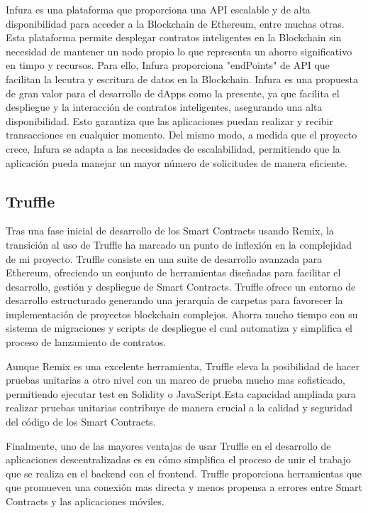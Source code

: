 Infura es una plataforma que proporciona una API escalable y de alta disponibilidad para acceder a la Blockchain de Ethereum, entre muchas otras.
Esta plataforma permite desplegar contratos inteligentes en la Blockchain sin necesidad de mantener un nodo propio lo que representa un ahorro significativo en timpo y recursos.
Para ello, Infura proporciona "endPoints" de API que facilitan la lecutra y escritura de datos en la Blockchain.
Infura es una propuesta de gran valor para el desarrollo de dApps como la presente, ya que facilita el despliegue y la interacción de contratos inteligentes, asegurando una alta disponibilidad. Esto garantiza que las aplicaciones puedan realizar y recibir transacciones en cualquier momento.
Del mismo modo, a medida que el proyecto crece, Infura se adapta a las necesidades de escalabilidad, permitiendo que la aplicación pueda manejar un mayor número de solicitudes de manera eficiente.


\subsection{Truffle}

Tras una fase inicial de desarrollo de los Smart Contracts usando Remix, la transición al uso de Truffle ha marcado un punto de inflexión en la complejidad de mi proyecto.
Truffle consiste en una suite de desarrollo avanzada para Ethereum, ofreciendo un conjunto de herramientas diseñadas para facilitar el desarrollo, gestión y despliegue de Smart Contracts.
Truffle ofrece un entorno de desarrollo estructurado generando una jerarquía de carpetas para favorecer la implementación de proyectos blockchain complejos.
Ahorra mucho tiempo con su sistema de migraciones y scripts de despliegue el cual automatiza y simplifica el proceso de lanzamiento de contratos.

Aunque Remix es una excelente herramienta, Truffle eleva la posibilidad de hacer pruebas unitarias a otro nivel con un marco de prueba mucho mas sofisticado, permitiendo ejecutar test en Solidity o JavaScript.Esta capacidad ampliada para realizar pruebas unitarias contribuye de manera crucial a la calidad y seguridad del código de los Smart Contracts.

Finalmente, uno de las mayores ventajas de usar Truffle en el desarrollo de aplicaciones descentralizadas es en cómo simplifica el proceso de unir el trabajo que se realiza en el backend con el frontend. Truffle proporciona herramientas que que promueven una conexión mas directa y menos propensa a errores entre Smart Contracts y las aplicaciones móviles.


